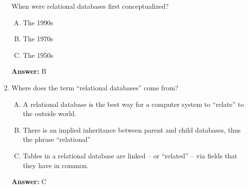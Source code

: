 \documentclass[12pt]{article}
\begin{document}
\begin{enumerate}[1.]
    When were relational databases first conceptualized?

    \bigskip

    \begin{enumerate}[A.]
        \item The 1990s
        \item The 1970s
        \item The 1950s
    \end{enumerate}

    \bigskip

    \textbf{Answer:} B

    \item

    Where does the term “relational databases” come from?

    \bigskip

    \begin{enumerate}[A.]
        \item A relational database is the best way for a computer system to “relate” to the outside world.
        \item There is an implied inheritance between parent and child databases, thus the phrase “relational”
        \item Tables in a relational database are linked -- or “related” -- via fields that they have in common.
    \end{enumerate}

    \bigskip

    \textbf{Answer:} C

\end{enumerate}
\end{document}
